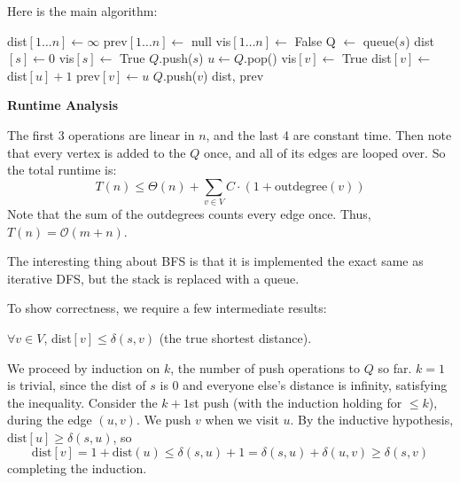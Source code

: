 \begin{algothm} 
    Here is the main algorithm:
    \begin{algorithmic}
            \State dist$[1\dots n] \gets \infty$
            \State prev$[1\dots n] \gets$ null
            \State vis$[1\dots n] \gets$ False
            \State Q $\gets$ queue($s$)
            \State dist$[s] \gets 0$
            \State vis$[s] \gets$ True
            \State $Q$.push($s$)
                \State $u \gets Q$.pop()
                        \State vis$[v] \gets$ True
                        \State dist$[v] \gets$ dist$[u] + 1$
                        \State prev$[v] \gets u$
                        \State $Q$.push($v$)
                    \EndIf
                \EndFor
            \EndWhile
            \State \Return dist, prev
        \EndFunction
    \end{algorithmic}

    \textbf{Runtime Analysis}
    \begin{proof*}
        The first 3 operations are linear in $n$, and the last 4 are constant time. Then note that every vertex is added to the $Q$ once, and all of its edges are looped over.
        So the total runtime is:
        \[ T(n) \leq \Theta(n) + \sum_{v \in V} C \cdot (1 + \text{outdegree}(v)) \]
        Note that the sum of the outdegrees counts every edge once. Thus, $T(n) = \mathcal{O}(m + n)$.
    \end{proof*}

\end{algothm}

The interesting thing about BFS is that it is implemented the exact same as iterative DFS, but the stack is replaced with a queue.

To show correctness, we require a few intermediate results: 
\begin{theorem} 
    $\forall v \in V$, dist$[v] \leq \delta(s, v)$ (the true shortest distance).

    \begin{proof*}
        We proceed by induction on $k$, the number of push operations to $Q$ so far. $k = 1$ is trivial, since the dist of $s$ is 0 and everyone else's
        distance is infinity, satisfying the inequality. Consider the $k + 1$st push (with the induction holding for $\leq k$), during the edge $(u, v)$. We push $v$ when we visit $u$.
        By the inductive hypothesis, $\text{dist}[u] \geq \delta(s, u)$, so 
        \[ \text{dist}[v] = 1 + \text{dist}(u) \leq \delta(s, u) + 1 = \delta(s, u) + \delta(u, v) \geq \delta(s, v) \]
        completing the induction.
    \end{proof*}
\end{theorem}

